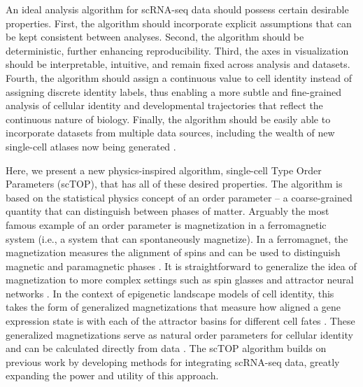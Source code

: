 \documentclass[aps,superscriptaddress, notitlepage,longbibliography]{revtex4-1}
\begin{document}
An ideal analysis algorithm for scRNA-seq data should possess certain desirable properties. First, the algorithm should incorporate explicit assumptions that can be kept consistent between analyses. Second, the algorithm should be deterministic, further enhancing reproducibility. Third, the axes in visualization should be interpretable, intuitive, and remain fixed across analysis and datasets. Fourth, the algorithm should assign a continuous value to cell identity instead of assigning discrete identity labels, thus enabling a more subtle and fine-grained analysis of cellular identity and developmental trajectories that reflect the continuous nature of biology. Finally, the algorithm should be easily able to incorporate datasets from multiple data sources, including the wealth of new single-cell atlases now being generated \cite{quake2022decade}.

Here, we present a new physics-inspired algorithm, single-cell Type Order Parameters (scTOP), that has all of these desired properties. The algorithm is based on the statistical physics concept of an order parameter -- a coarse-grained quantity that can distinguish between phases of matter. Arguably the most famous example of an order parameter is magnetization in a ferromagnetic system (i.e., a system that can spontaneously magnetize). In a ferromagnet, the magnetization measures the alignment of spins and can be used to distinguish magnetic and paramagnetic phases \cite{landau2013statistical,sethna2021statistical}. It is straightforward to generalize the idea of magnetization to more complex settings such as spin glasses and attractor neural networks \cite{amit1985spin}. In the context of epigenetic landscape models of cell identity, this takes the form of generalized magnetizations that measure how aligned a gene expression state is with each of the attractor basins for different cell fates \cite{lang_epigenetic_2014,pusuluri_cellular_2017}. These generalized magnetizations serve as natural order parameters for cellular identity and can be calculated directly from data \cite{lang_epigenetic_2014,pusuluri_cellular_2017, dame_thyroid_2017,ikonomou_vivo_2020}. The scTOP algorithm builds on previous work by developing methods for integrating scRNA-seq data, greatly expanding the power and utility of this approach. 
 
\end{document}
